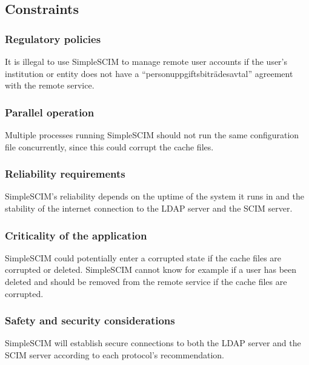\documentclass[12pt,twoside,a4paper,titlepage]{article}
\begin{document}
  \newpage

  \subsection{Constraints}

   \subsubsection{Regulatory policies}

   It is illegal to use SimpleSCIM to manage remote user accounts if
   the user's institution or entity does not have a
   ``personuppgiftsbiträdesavtal'' agreement with the remote service.

   \subsubsection{Parallel operation}

   Multiple processes running SimpleSCIM should not run the same
   configuration file concurrently, since this could corrupt the
   cache files.

   \subsubsection{Reliability requirements}

   SimpleSCIM's reliability depends on the uptime of the system it
   runs in and the stability of the internet connection to the LDAP
   server and the SCIM server.

   \subsubsection{Criticality of the application}

   SimpleSCIM could potentially enter a corrupted state if the cache
   files are corrupted or deleted. SimpleSCIM cannot know for example
   if a user has been deleted and should be removed from the remote
   service if the cache files are corrupted.

   \subsubsection{Safety and security considerations}

   SimpleSCIM will establish secure connections to both the LDAP
   server and the SCIM server according to each protocol's
   recommendation.
\end{document}
